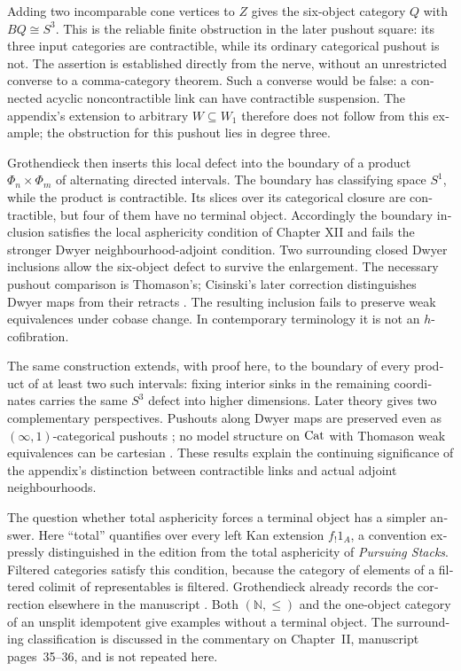 \begin{otherlanguage}{english}
Adding two incomparable cone vertices to \(Z\) gives the six-object category \(Q\) with \(BQ\cong S^3\). This is the reliable finite obstruction in the later pushout square: its three input categories are contractible, while its ordinary categorical pushout is not. The assertion is established directly from the nerve, without an unrestricted converse to a comma-category theorem. Such a converse would be false: a connected acyclic noncontractible link can have contractible suspension. The appendix's extension to arbitrary \(W\subseteq W_1\) therefore does not follow from this example; the obstruction for this pushout lies in degree three.

Grothendieck then inserts this local defect into the boundary of a product \(\Phi_n\times\Phi_m\) of alternating directed intervals. The boundary has classifying space \(S^1\), while the product is contractible. Its slices over its categorical closure are contractible, but four of them have no terminal object. Accordingly the boundary inclusion satisfies the local asphericity condition of Chapter XII and fails the stronger Dwyer neighbourhood-adjoint condition. Two surrounding closed Dwyer inclusions allow the six-object defect to survive the enlargement. The necessary pushout comparison is Thomason's; Cisinski's later correction distinguishes Dwyer maps from their retracts \citep{Thomason1980,Cisinski1999Dwyer}. The resulting inclusion fails to preserve weak equivalences under cobase change. In contemporary terminology it is not an \(h\)-cofibration.

The same construction extends, with proof here, to the boundary of every product of at least two such intervals: fixing interior sinks in the remaining coordinates carries the same \(S^3\) defect into higher dimensions. Later theory gives two complementary perspectives. Pushouts along Dwyer maps are preserved even as \((\infty,1)\)-categorical pushouts \citep{HackneyOzornovaRiehlRovelli2024}; no model structure on \(\mathrm{Cat}\) with Thomason weak equivalences can be cartesian \citep[Proposition~4.3]{Pavlov2024Thomason}. These results explain the continuing significance of the appendix's distinction between contractible links and actual adjoint neighbourhoods.

The question whether total asphericity forces a terminal object has a simpler answer. Here ``total'' quantifies over every left Kan extension \(f_!1_A\), a convention expressly distinguished in the edition from the total asphericity of \emph{Pursuing Stacks}. Filtered categories satisfy this condition, because the category of elements of a filtered colimit of representables is filtered. Grothendieck already records the correction elsewhere in the manuscript \citep[Chapter II, Corollaries~2.17--2.18]{Grothendieck1990II}. Both \((\mathbb N,\leq)\) and the one-object category of an unsplit idempotent give examples without a terminal object. The surrounding classification is discussed in the commentary on Chapter~II, manuscript pages~35--36, and is not repeated here.


\end{otherlanguage}
